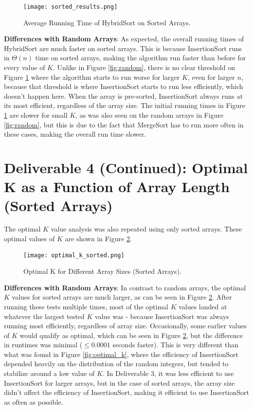 \documentclass{article}
\begin{document}
\begin{figure}[h]
    \centering
    \texttt{[image: sorted\_results.png]}
    \caption{Average Running Time of HybridSort on Sorted Arrays.}
    \label{fig:sorted}
\end{figure}
	
\textbf{Differences with Random Arrays}: As expected, the overall running times of HybridSort are much faster on sorted arrays. This is because InsertionSort runs in $\Theta(n)$ time on sorted arrays, making the algorithm run faster than before for every value of $K$. Unlike in Figure \ref{fig:random}, there is no clear threshold on Figure \ref{fig:sorted} where the algorithm starts to run worse for larger $K$, even for larger $n$, because that threshold is where InsertionSort starts to run less efficiently, which doesn't happen here. When the array is pre-sorted, InsertionSort always runs at its most efficient, regardless of the array size. The initial running times in Figure \ref{fig:sorted} are slower for small $K$, as was also seen on the random arrays in Figure \ref{fig:random}, but this is due to the fact that MergeSort has to run more often in these cases, making the overall run time slower. 
	
\section*{Deliverable 4 (Continued): Optimal K as a Function of Array Length (Sorted Arrays)}
	
The optimal \( K \) value analysis was also repeated using only sorted arrays. These optimal values of \( K \) are shown in Figure \ref{fig:optimal_k_sorted}.
	
\begin{figure}[h]
    \centering
    \texttt{[image: optimal\_k\_sorted.png]}
    \caption{Optimal K for Different Array Sizes (Sorted Arrays).}
    \label{fig:optimal_k_sorted}
\end{figure}
	
\textbf{Differences with Random Arrays}: In contrast to random arrays, the optimal \( K \) values for sorted arrays are much larger, as can be seen in Figure \ref{fig:optimal_k_sorted}. After running these tests multiple times, most of the optimal $K$ values landed at whatever the largest tested $K$ value was - because InsertionSort was always running most efficiently, regardless of array size. Occasionally, some earlier values of $K$ would qualify as optimal, which can be seen in Figure \ref{fig:optimal_k_sorted}, but the difference in runtimes was minimal ($\leq 0.0001$ seconds faster). This is very different than what was found in Figure \ref{fig:optimal_k}, where the efficiency of InsertionSort depended heavily on the distribution of the random integers, but tended to stabilize around a low value of $K$. In Deliverable 3, it was less efficient to use InsertionSort for larger arrays, but in the case of sorted arrays, the array size didn't affect the efficiency of InsertionSort, making it efficient to use InsertionSort as often as possible.  \\
\end{document}
